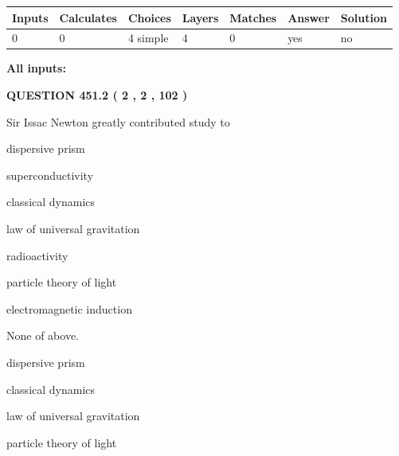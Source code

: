 \documentclass[12pt]{article}
\begin{document}
 
   
   
   
   
\noindent\begin{tabular}{|l|l|l|l|l|l|l|}
 \hline
Inputs & Calculates & Choices & Layers & Matches & Answer & Solution \\ \hline
 0  & 
 0  & 
 4
  simple  
  & 
 4  & 
 0  & 
  yes & 
  no 
  \\ \hline
 \end{tabular}
   
   
   
   
\noindent{}
   
   
   
   
\noindent\vspace{0.1in}\hspace{-0.08in} {\textbf{\Large{All inputs: }}}
   
   
  
\vspace{0.2in}
  
{\textbf{\Large{QUESTION
451.2 
 ( 2 , 2 , 102 )
}}}
  
  
Sir Issac Newton greatly contributed study to
 
 
dispersive prism
 
 
superconductivity
 
 
classical dynamics
 
 
law of universal gravitation
 
 
radioactivity
 
 
particle theory of light
 
 
electromagnetic induction
 
 
 None of above.
 
 
\noindent{}
 
 
dispersive prism
 
 
classical dynamics
 
 
law of universal gravitation
 
 
particle theory of light
 
\end{document}
